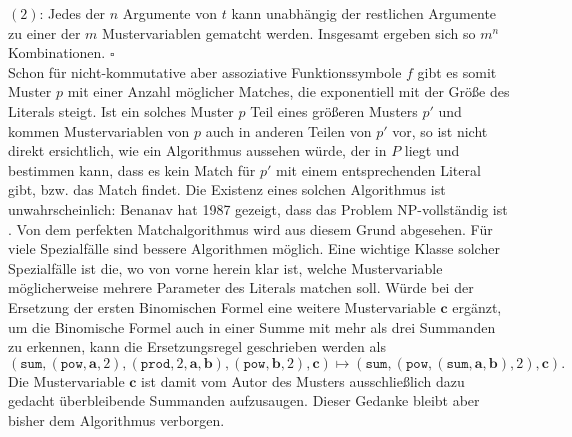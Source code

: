 $(2)$: Jedes der $n$ Argumente von $t$ kann unabhängig der restlichen Argumente zu einer der $m$ Mustervariablen gematcht werden. Insgesamt ergeben sich so $m^n$ Kombinationen.
\hfill $\square$\\

Schon für nicht-kommutative aber assoziative Funktionssymbole $f$ gibt es somit Muster $p$ mit einer Anzahl möglicher Matches, die exponentiell mit der Größe des Literals steigt. Ist ein solches Muster $p$ Teil eines größeren Musters $p'$ und kommen Mustervariablen von $p$ auch in anderen Teilen von $p'$ vor, so ist nicht direkt ersichtlich, wie ein Algorithmus aussehen würde, der in $P$ liegt und bestimmen kann, dass es kein Match für $p'$ mit einem entsprechenden Literal gibt, bzw. das Match findet. Die Existenz eines solchen Algorithmus ist unwahrscheinlich: Benanav hat 1987 gezeigt, dass das Problem NP-vollständig ist \cite{NPHardMatching}.
Von dem perfekten Matchalgorithmus wird aus diesem Grund abgesehen. Für viele Spezialfälle sind bessere Algorithmen möglich. Eine wichtige Klasse solcher Spezialfälle ist die, wo von vorne herein klar ist, welche Mustervariable möglicherweise mehrere Parameter des Literals matchen soll. Würde bei der Ersetzung der ersten Binomischen Formel eine weitere Mustervariable $\mathbf c$ ergänzt, um die Binomische Formel auch in einer Summe mit mehr als drei Summanden zu erkennen, kann die Ersetzungsregel geschrieben werden als
$$(\texttt{sum}, (\texttt{pow}, \mathbf a, 2), (\texttt{prod}, 2, \mathbf a, \mathbf b), (\texttt{pow}, \mathbf b, 2), \mathbf c) \mapsto (\texttt{sum}, (\texttt{pow}, (\texttt{sum}, \mathbf a, \mathbf b), 2), \mathbf c).$$
Die Mustervariable $\mathbf c$ ist damit vom Autor des Musters ausschließlich dazu gedacht überbleibende Summanden \glqq aufzusaugen\grqq{}. Dieser Gedanke bleibt aber bisher dem Algorithmus verborgen.
